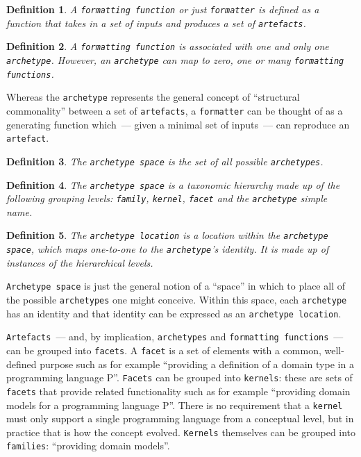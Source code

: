 \documentclass{book}
\newtheorem{concept}{Definition}
\begin{document}
\begin{concept}
A \texttt{formatting function} or just \texttt{formatter} is defined
as a function that takes in a set of inputs and produces a set of
\texttt{artefacts}.
\end{concept}

\begin{concept}
A \texttt{formatting function} is associated with one and only one
\texttt{archetype}. However, an \texttt{archetype} can map to zero,
one or many \texttt{formatting functions}.
\end{concept}

Whereas the \texttt{archetype} represents the general concept of
``structural commonality'' between a set of \texttt{artefacts}, a
\texttt{formatter} can be thought of as a generating function
which~--- given a minimal set of inputs~--- can reproduce an
\texttt{artefact}.

\begin{concept}
The \texttt{archetype space} is the set of all possible
\texttt{archetypes}.
\end{concept}

\begin{concept}
  The \texttt{archetype space} is a taxonomic hierarchy made up of the
  following grouping levels: \texttt{family}, \texttt{kernel},
  \texttt{facet} and the \texttt{archetype} simple name.
\end{concept}

\begin{concept}
The \texttt{archetype location} is a location within the
\texttt{archetype space}, which maps one-to-one to the
\texttt{archetype}'s identity. It is made up of instances of the
hierarchical levels.
\end{concept}

\texttt{Archetype space} is just the general notion of a ``space'' in
which to place all of the possible \texttt{archetypes} one might
conceive. Within this space, each \texttt{archetype} has an identity
and that identity can be expressed as an \texttt{archetype location}.

\texttt{Artefacts}~--- and, by implication, \texttt{archetypes} and
\texttt{formatting functions}~--- can be grouped into
\texttt{facets}. A \texttt{facet} is a set of elements with a common,
well-defined purpose such as for example ``providing a definition of a
domain type in a programming language P''. \texttt{Facets} can be
grouped into \texttt{kernels}: these are sets of \texttt{facets} that
provide related functionality such as for example ``providing domain
models for a programming language P''. There is no requirement that a
\texttt{kernel} must only support a single programming language from a
conceptual level, but in practice that is how the concept evolved.
\texttt{Kernels} themselves can be grouped into \texttt{families}:
``providing domain models''.
\end{document}
